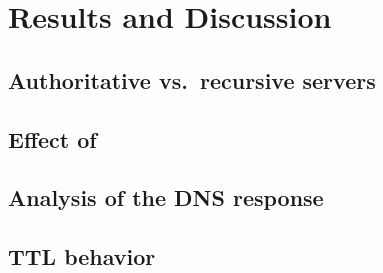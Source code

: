 \section{Results and Discussion}\label{sec:results}


\subsection{Authoritative vs.\ recursive servers}\label{sec:res-auth-rec}

\subsection{Effect of }\label{sec:res-root-hints}

\subsection{Analysis of the DNS response}\label{sec:res-response}

\subsection{TTL behavior}\label{sec:res-ttl}
